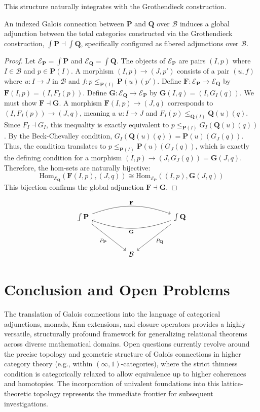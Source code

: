 This structure naturally integrates with the Grothendieck construction.
\begin{theorem}
An indexed Galois connection between $\mathbf{P}$ and $\mathbf{Q}$ over $\mathcal{B}$ induces a global adjunction between the total categories constructed via the Grothendieck construction, $\int \mathbf{P} \dashv \int \mathbf{Q}$, specifically configured as fibered adjunctions over $\mathcal{B}$.
\end{theorem}
\begin{proof}
Let $\mathcal{E}_{\mathbf{P}} = \int \mathbf{P}$ and $\mathcal{E}_{\mathbf{Q}} = \int \mathbf{Q}$. The objects of $\mathcal{E}_{\mathbf{P}}$ are pairs $(I, p)$ where $I \in \mathcal{B}$ and $p \in \mathbf{P}(I)$. A morphism $(I, p) \to (J, p')$ consists of a pair $(u, f)$ where $u: I \to J$ in $\mathcal{B}$ and $f: p \leq_{\mathbf{P}(I)} \mathbf{P}(u)(p')$.
Define $\mathbf{F}: \mathcal{E}_{\mathbf{P}} \to \mathcal{E}_{\mathbf{Q}}$ by $\mathbf{F}(I, p) = (I, F_I(p))$.
Define $\mathbf{G}: \mathcal{E}_{\mathbf{Q}} \to \mathcal{E}_{\mathbf{P}}$ by $\mathbf{G}(I, q) = (I, G_I(q))$.
We must show $\mathbf{F} \dashv \mathbf{G}$.
A morphism $\mathbf{F}(I, p) \to (J, q)$ corresponds to $(I, F_I(p)) \to (J, q)$, meaning a $u: I \to J$ and $F_I(p) \leq_{\mathbf{Q}(I)} \mathbf{Q}(u)(q)$.
Since $F_I \dashv G_I$, this inequality is exactly equivalent to $p \leq_{\mathbf{P}(I)} G_I(\mathbf{Q}(u)(q))$.
By the Beck-Chevalley condition, $G_I(\mathbf{Q}(u)(q)) = \mathbf{P}(u)(G_J(q))$.
Thus, the condition translates to $p \leq_{\mathbf{P}(I)} \mathbf{P}(u)(G_J(q))$, which is exactly the defining condition for a morphism $(I, p) \to (J, G_J(q)) = \mathbf{G}(J, q)$.
Therefore, the hom-sets are naturally bijective:
\[ \text{Hom}_{\mathcal{E}_{\mathbf{Q}}}(\mathbf{F}(I, p), (J, q)) \cong \text{Hom}_{\mathcal{E}_{\mathbf{P}}}((I, p), \mathbf{G}(J, q)) \]
This bijection confirms the global adjunction $\mathbf{F} \dashv \mathbf{G}$.
\end{proof}

\[\begin{tikzcd}[row sep=huge, column sep=huge]
\int \mathbf{P} \arrow[rr, "\mathbf{F}", bend left=20] \arrow[dr, "P_{\mathbf{P}}"'] & & \int \mathbf{Q} \arrow[ll, "\mathbf{G}", bend left=20] \arrow[dl, "P_{\mathbf{Q}}"] \\
& \mathcal{B} &
\end{tikzcd}\]

\section{Conclusion and Open Problems}
The translation of Galois connections into the language of categorical adjunctions, monads, Kan extensions, and closure operators provides a highly versatile, structurally profound framework for generalizing relational theorems across diverse mathematical domains. Open questions currently revolve around the precise topology and geometric structure of Galois connections in higher category theory (e.g., within $(\infty, 1)$-categories), where the strict thinness condition is categorically relaxed to allow equivalence up to higher coherences and homotopies. The incorporation of univalent foundations into this lattice-theoretic topology represents the immediate frontier for subsequent investigations.
